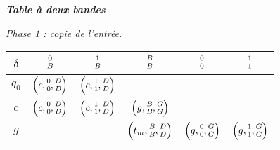 \begin{center}
	\emph{\bfseries Table à deux bandes}
	
	\smallskip
	\emph{\small Phase 1 : copie de l'entrée.}
	
	\smallskip
	\renewcommand{\arraystretch}{1.25}
	\begin{tabular}{|c||c|c|c|c|c|}
		\hline
		$\delta$ 
			& ${\scriptsize\begin{matrix}0\\B\end{matrix}}$ 
			& ${\scriptsize\begin{matrix}1\\B\end{matrix}}$ 
			& ${\scriptsize\begin{matrix}B\\B\end{matrix}}$ 
			& ${\scriptsize\begin{matrix}0\\0\end{matrix}}$ 
			& ${\scriptsize\begin{matrix}1\\1\end{matrix}}$ \\
		\hline
		\hline
		$q_0$ 
			& $\left( c, {\scriptsize\begin{matrix}0\\0\end{matrix}}, {\scriptsize\begin{matrix}D\\D\end{matrix}} \right)$ 
			& $\left( c, {\scriptsize\begin{matrix}1\\1\end{matrix}}, {\scriptsize\begin{matrix}D\\D\end{matrix}} \right)$
			&                   
			&                   
			&                                                      \\
		\hline
		$c$ 
			& $\left( c, {\scriptsize\begin{matrix}0\\0\end{matrix}}, {\scriptsize\begin{matrix}D\\D\end{matrix}} \right)$ 
			& $\left( c, {\scriptsize\begin{matrix}1\\1\end{matrix}}, {\scriptsize\begin{matrix}D\\D\end{matrix}} \right)$
			& $\left( g, {\scriptsize\begin{matrix}B\\B\end{matrix}}, {\scriptsize\begin{matrix}G\\G\end{matrix}} \right)$
			&                   
			&                                                      \\
		\hline
		$g$ 
			&                     
			&                   
			& $\left( t_m, {\scriptsize\begin{matrix}B\\B\end{matrix}}, {\scriptsize\begin{matrix}D\\D\end{matrix}} \right)$
			& $\left( g  , {\scriptsize\begin{matrix}0\\0\end{matrix}}, {\scriptsize\begin{matrix}G\\G\end{matrix}} \right)$ 
			& $\left( g  , {\scriptsize\begin{matrix}1\\1\end{matrix}}, {\scriptsize\begin{matrix}G\\G\end{matrix}} \right)$ \\
		\hline
	\end{tabular}
	\renewcommand{\arraystretch}{1}
\end{center}



